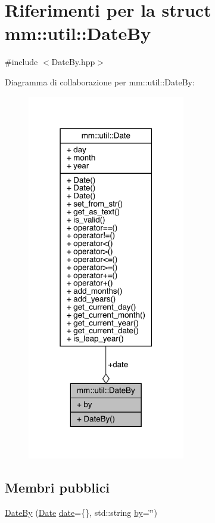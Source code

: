 \hypertarget{structmm_1_1util_1_1_date_by}{}\section{Riferimenti per la struct mm\+:\+:util\+:\+:Date\+By}
\label{structmm_1_1util_1_1_date_by}


{\ttfamily \#include $<$Date\+By.\+hpp$>$}



Diagramma di collaborazione per mm\+:\+:util\+:\+:Date\+By\+:\nopagebreak
\begin{figure}[H]
\begin{center}
\leavevmode
\includegraphics[width=195pt]{d2/d03/structmm_1_1util_1_1_date_by__coll__graph}
\end{center}
\end{figure}
\subsection*{Membri pubblici}
\begin{DoxyCompactItemize}
\item 
\hyperlink{structmm_1_1util_1_1_date_by_a2e30c048476714b88489a1a90a1f976c}{Date\+By} (\hyperlink{structmm_1_1util_1_1_date}{Date} \hyperlink{structmm_1_1util_1_1_date_by_a4adb77c6560794be119e39b374498b68}{date}=\{\}, std\+::string \hyperlink{structmm_1_1util_1_1_date_by_ae431f5029222a6ec9293c4c4564834f3}{by}=\char`\"{}\char`\"{})
\end{DoxyCompactItemize}
